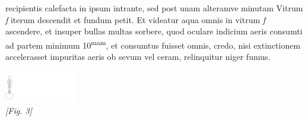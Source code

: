  recipientis  calefacta in ipsum intrante, sed  post unam alteramve minutam  Vitrum \textit{f} iterum descendit et fundum petit. Et videatur aqua omnis in vitrum \textit{f} ascendere, et  insuper bullas multas sorbere, quod  oculare indicium aeris consumti ad partem minimum 10\textsuperscript{mam}, et consumtus  fuisset omnis, credo, nisi extinctionem accelerasset impuritas aeris ob sevum vel ceram, relinquitur niger fumus.\pend
   \begin{center}
                \includegraphics[width=0.24\textwidth]{images/LH35_14_2_94r1}\\\textit{[Fig. 3]} 
                      \end{center}